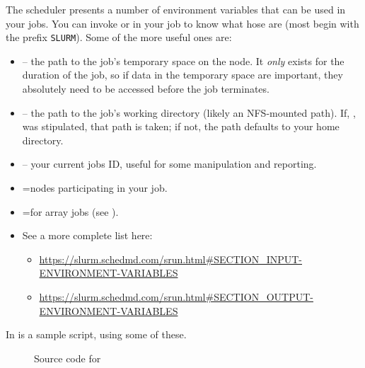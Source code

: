 \label{sect:env-vars}

The scheduler presents a number of environment variables that can be used in 
your jobs. You can invoke  or  in your
job to know what hose are (most begin with the prefix \texttt{SLURM}).
%
Some of the more useful ones are:

\begin{itemize}
\item
 -- the path to the job's temporary space on the node. It
\emph{only} exists for the duration of the job, so if data in the temporary space 
are important, they absolutely need to be accessed before the job terminates.

\item
{} -- the path to the job's working directory (likely an
NFS-mounted path). If, , was stipulated, that path is taken; if not, 
the path defaults to your home directory.


\item
{} -- your current jobs ID, useful for some manipulation
and reporting.

\item
{}=nodes participating in your job.

\item
{}=for array jobs (see ).

\item
See a more complete list here:

\small
\begin{itemize}
\item
\url{https://slurm.schedmd.com/srun.html#SECTION_INPUT-ENVIRONMENT-VARIABLES}
\item
\url{https://slurm.schedmd.com/srun.html#SECTION_OUTPUT-ENVIRONMENT-VARIABLES}
\end{itemize}
\normalsize

\end{itemize}

\noindent
In  is a sample script, using some of these.

\begin{figure}[htpb]
    
    \caption{Source code for }
	\label{fig:tmpdir.sh}
\end{figure}
